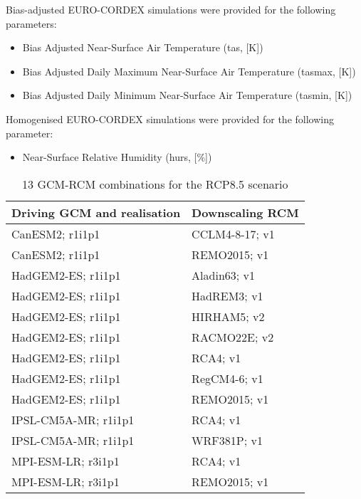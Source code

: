 \documentclass[a4paper, 11pt]{scrartcl}
\begin{document}
Bias-adjusted EURO-CORDEX simulations were provided for the following parameters:
\begin{itemize}
\item Bias Adjusted Near-Surface Air Temperature (tas, [K])
\item Bias Adjusted Daily Maximum Near-Surface Air Temperature (tasmax, [K])
\item Bias Adjusted Daily Minimum Near-Surface Air Temperature (tasmin, [K])
\end{itemize}

Homogenised EURO-CORDEX simulations were provided for the following parameter:
\begin{itemize}
\item Near-Surface Relative Humidity (hurs, [\%])
\end{itemize}


\begin{table}[h!]
\caption{13 GCM-RCM combinations for the RCP8.5 scenario}
\label{tab:climate_models}
\begin{tabularx}{\textwidth}{@{}ll@{}}
\toprule
\textbf{Driving GCM and realisation}  & \textbf{Downscaling RCM} 	\\
\midrule
CanESM2; r1i1p1 				 	  & CCLM4-8-17; v1  		 	\\
CanESM2; r1i1p1 				 	  & REMO2015; v1 				\\
HadGEM2-ES; r1i1p1 					  & Aladin63; v1 				\\
HadGEM2-ES; r1i1p1 					  & HadREM3; v1 				\\
HadGEM2-ES; r1i1p1 					  & HIRHAM5; v2 				\\
HadGEM2-ES; r1i1p1 					  & RACMO22E; v2 				\\
HadGEM2-ES; r1i1p1 					  & RCA4; v1 					\\
HadGEM2-ES; r1i1p1 					  & RegCM4-6; v1 				\\
HadGEM2-ES; r1i1p1 					  & REMO2015; v1 				\\
IPSL-CM5A-MR; r1i1p1 				  & RCA4; v1 					\\
IPSL-CM5A-MR; r1i1p1 				  & WRF381P; v1 				\\
MPI-ESM-LR; r3i1p1 					  & RCA4; v1 					\\
MPI-ESM-LR; r3i1p1 					  & REMO2015; v1 				\\
\bottomrule
\end{tabularx}
\end{table}
\end{document}
